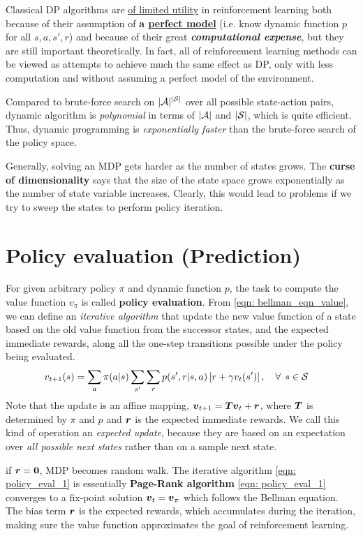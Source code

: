 \documentclass[11pt]{article}
\begin{document}
Classical DP algorithms are \underline{of limited utility} in reinforcement learning both because of their assumption of \textbf{a  \underline{perfect model}} (i.e. know dynamic function $p$ for all $s, a, s', r$) and because of their great \emph{\textbf{computational expense}}, but they are still important theoretically. In fact, all of reinforcement learning methods can be viewed as attempts to achieve much the same effect as DP, only with less computation and without assuming a perfect model of the environment.

Compared to brute-force search on $|{\mathcal A}|^{|{\mathcal S}|}$ over all possible state-action pairs, dynamic algorithm is \emph{polynomial} in terms of $|{\mathcal A}|$ and $|{\mathcal S}|$, which is quite efficient. Thus, dynamic programming is \emph{exponentially faster} than the brute-force search of the policy space.

Generally, solving an MDP gets harder as the number of states grows. The \textbf{curse of dimensionality} says that the size of the state space grows exponentially as the number of state variable increases.  Clearly, this would lead to problems if we try to sweep the states to perform policy iteration.

\section{Policy evaluation (Prediction)}
For given arbitrary policy $\pi$ and dynamic function $p$, the task to compute the value function $v_{\pi}$ is called \textbf{policy evaluation}. From \eqref{eqn: bellman_eqn_value}, we can define an \emph{iterative algorithm} that update the new value function of a state based on the old value function from the successor states, and the expected immediate rewards, along all the one-step transitions possible under the policy being evaluated. 
\begin{align}
v_{t+1}(s) &=    \sum_{a}\pi(a|s)\sum_{s'}\sum_{r}p(s', r| s, a)\left[r + \gamma v_{t}(s')\right], \quad \forall\,\; s\in {\mathcal S}  \label{eqn: policy_eval_1}
\end{align} Note that the update is an affine mapping, $\boldsymbol{v}_{t+1} = \boldsymbol{T}\boldsymbol{v}_{t} + \boldsymbol{r}$, where $\boldsymbol{T}$ is determined by $\pi$ and $p$ and $\boldsymbol{r}$ is the expected immediate rewards. We call this kind of operation an \emph{expected update}, because they are based on an expectation over \emph{all possible next states} rather than on a sample next state.

if $\boldsymbol{r}=\boldsymbol{0}$, MDP becomes random walk. The iterative algorithm \eqref{eqn: policy_eval_1} is essentially \textbf{Page-Rank algorithm}  \eqref{eqn: policy_eval_1} converges to a fix-point solution $\boldsymbol{v}_{t} = \boldsymbol{v}_{\pi}$ which follows the Bellman equation. The bias term $\boldsymbol{r}$ is the expected rewards, which accumulates during the iteration, making sure the value function approximates  the goal of reinforcement learning. 
\end{document}
